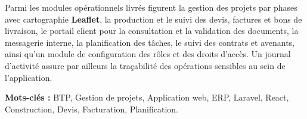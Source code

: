 \vspace{0.35cm}

Parmi les modules opérationnels livrés figurent la gestion des projets par phases avec
cartographie \textbf{Leaflet}, la production et le suivi des devis, factures et bons de
livraison, le portail client pour la consultation et la validation des documents, la
messagerie interne, la planification des tâches, le suivi des contrats et avenants, ainsi
qu'un module de configuration des rôles et des droits d'accès. Un journal d'activité assure
par ailleurs la traçabilité des opérations sensibles au sein de l'application.

\vspace{0.5cm}
\noindent\textbf{Mots-clés :} BTP, Gestion de projets, Application web, ERP, Laravel, React,
Construction, Devis, Facturation, Planification.
